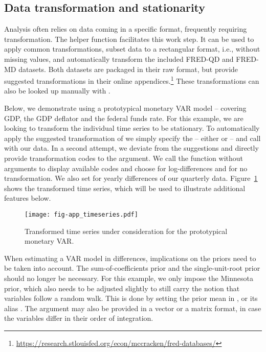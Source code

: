 \documentclass[article,nojss]{jss} %
\begin{document}
\begin{appendix}

\section{Data transformation and stationarity}\label{app:data}

Analysis often relies on data coming in a specific format, frequently requiring transformation. The helper function  facilitates this work step. It can be used to apply common transformations, subset data to a rectangular format, i.e., without missing values, and automatically transform the included FRED-QD and FRED-MD datasets.
Both datasets are packaged in their raw format, but \cite{mccracken2016} provide suggested transformations in their online appendices.\footnote{\url{https://research.stlouisfed.org/econ/mccracken/fred-databases/}} These transformations can also be looked up manually with .

Below, we demonstrate using a prototypical monetary VAR model -- covering GDP, the GDP deflator and the federal funds rate. For this example, we are looking to transform the individual time series to be stationary.
To automatically apply the suggested transformation of \cite{mccracken2016} we simply specify the  -- either  or  -- and call  with our data.
In a second attempt, we deviate from the suggestions and directly provide transformation codes to the  argument. We call the function without arguments to display available codes and choose  for log-differences and  for no transformation. We also set  for yearly differences of our quarterly data. Figure~\ref{fig:app_timeseries} shows the transformed time series, which will be used to illustrate additional features below.



\begin{figure}[ht]
  \centering
  \texttt{[image: fig-app\_timeseries.pdf]}
  \caption{Transformed time series under consideration for the prototypical monetary VAR.}
  \label{fig:app_timeseries}
\end{figure}

When estimating a VAR model in differences, implications on the priors need to be taken into account. The sum-of-coefficients prior and the single-unit-root prior should no longer be necessary.
For this example, we only impose the Minnesota prior, which also needs to be adjusted slightly to still carry the notion that variables follow a random walk. This is done by setting the prior mean  in , or its alias . The argument may also be provided in a vector or a matrix format, in case the variables differ in their order of integration.


\end{appendix}
\end{document}
